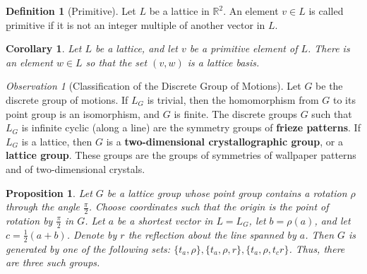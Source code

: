 \documentclass[12pt]{article}
\newtheorem{cor}[thm]{Corollary}
\newtheorem{prop}[thm]{Proposition}
\theoremstyle{definition}
\newtheorem{defn}[thm]{Definition}
\theoremstyle{remark}
\newtheorem{obs}[thm]{Observation}
\numberwithin{equation}{section}
\newcommand\R{\mathbb R}    %
\newcommand\B[1]{\textbf{ #1}}
\begin{document}
\vspace{15pt}

\begin{defn}[Primitive]
        Let $L$ be a lattice in $\R^2$. An element $v \in L$ is called \b{primitive} if it is not an integer multiple of another vector in $L$.
\end{defn}

\vspace{15pt}

\begin{cor}
        Let $L$ be a lattice, and let $v$ be a primitive element of $L$. There is an element $w \in L$ so that the set $(v,w)$ is a lattice basis.
\end{cor}

\vspace{15pt}

\begin{obs}[Classification of the Discrete Group of Motions]
        Let $G$ be the discrete group of motions. If $L_G$ is trivial, then the homomorphism from $G$ to its point group is an isomorphism, and $G$ is finite. The discrete groups $G$ such that $L_G$ is infinite cyclic (along a line) are the symmetry groups of \B{frieze patterns}. If $L_G$ is a lattice, then $G$ is a \B{two-dimensional crystallographic group}, or a \B{lattice group}. These groups are the groups of symmetries of wallpaper patterns and of two-dimensional crystals.
\end{obs}


\vspace{15pt}

\begin{prop}
        Let $G$ be a lattice group whose point group contains a rotation $\rho$ through the angle $\frac{\pi}{2}$. Choose coordinates such that the origin is the point of rotation by $\frac{\pi}{2}$ in $G$. Let $a$ be a shortest vector in $L = L_G$, let $b = \rho(a)$, and let $c = \frac{1}{2}(a+b)$. Denote by $r$ the reflection about the line spanned by $a$. Then $G$ is generated by one of the following sets: $\{t_a,\rho\},\{t_a,\rho,r\},\{t_a,\rho,t_cr\}$. Thus, there are three such groups.
\end{prop}
\end{document}
